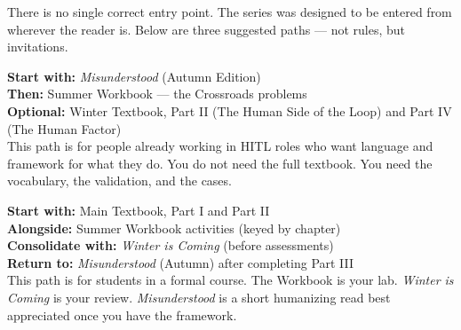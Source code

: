 \documentclass[12pt, a4paper]{article}
\begin{document}
There is no single correct entry point. The series was designed to be entered from wherever the reader is. Below are three suggested paths — not rules, but invitations.

\vspace{10pt}

\begin{tcolorbox}[
  enhanced,
  colback=white,
  colframe=springgreen,
  arc=4pt,
  boxrule=1pt,
  left=12pt, right=12pt, top=10pt, bottom=10pt,
  attach boxed title to top left={yshift=-2mm, xshift=6mm},
  boxed title style={colback=springgreen, colframe=springgreen, arc=3pt, boxrule=0pt,
    fontupper=\small\bfseries\sffamily\color{white}, left=6pt, right=6pt, top=3pt, bottom=3pt},
  title={Practitioner Path}
]
\textbf{Start with:} \textit{Misunderstood} (Autumn Edition)\\
\textbf{Then:} Summer Workbook — the Crossroads problems\\
\textbf{Optional:} Winter Textbook, Part II (The Human Side of the Loop) and Part IV (The Human Factor)\\[6pt]
This path is for people already working in HITL roles who want language and framework for what they do. You do not need the full textbook. You need the vocabulary, the validation, and the cases.
\end{tcolorbox}

\vspace{10pt}

\begin{tcolorbox}[
  enhanced,
  colback=white,
  colframe=winterblue,
  arc=4pt,
  boxrule=1pt,
  left=12pt, right=12pt, top=10pt, bottom=10pt,
  attach boxed title to top left={yshift=-2mm, xshift=6mm},
  boxed title style={colback=winterblue, colframe=winterblue, arc=3pt, boxrule=0pt,
    fontupper=\small\bfseries\sffamily\color{white}, left=6pt, right=6pt, top=3pt, bottom=3pt},
  title={Student Path}
]
\textbf{Start with:} Main Textbook, Part I and Part II\\
\textbf{Alongside:} Summer Workbook activities (keyed by chapter)\\
\textbf{Consolidate with:} \textit{Winter is Coming} (before assessments)\\
\textbf{Return to:} \textit{Misunderstood} (Autumn) after completing Part III\\[6pt]
This path is for students in a formal course. The Workbook is your lab. \textit{Winter is Coming} is your review. \textit{Misunderstood} is a short humanizing read best appreciated once you have the framework.
\end{tcolorbox}
\end{document}
